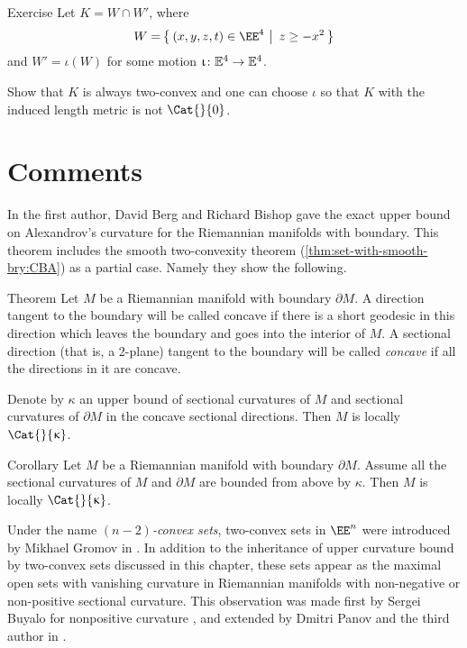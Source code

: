 \begin{thm}{Exercise}\label{ex:two-convex-not-a-CAT}
Let $K=W\cap W'$, where 
\[W=\set{(x,y,z,t)\in \EE^4}{z\ge -x^2}\]
and $W'=\iota(W)$ for some motion $\iota\:\EE^4\to\EE^4$.

Show that $K$ is always two-convex and one can choose $\iota$ so that $K$  with the induced length metric is not $\Cat{}{0}$.
\end{thm}









\section{Comments}

In \cite{a-b-b:CBA-m-w-b} the first author, David Berg and Richard Bishop gave the exact upper bound on Alexandrov's curvature for the Riemannian manifolds with boundary.
This theorem includes the smooth two-convexity theorem (\ref{thm:set-with-smooth-bry:CBA}) as a partial case.
Namely they show the following.

\begin{thm}{Theorem}
Let $M$ be a Riemannian manifold with boundary $\partial M$.
A direction tangent to the boundary will be called concave if there is a short geodesic in this direction which leaves the boundary and goes into the interior of $M$.
A sectional direction (that is, a 2-plane) 
tangent to the boundary 
will be called \emph{concave} if all the directions in it are concave.

Denote by $\kappa$ an upper bound of sectional curvatures of $M$ and  
sectional curvatures of $\partial M$ in the concave sectional directions. 
Then $M$ is locally $\Cat{}{\kappa}$. 
\end{thm}

\begin{thm}{Corollary}
Let $M$ be a Riemannian manifold with boundary $\partial M$. 
Assume all the sectional curvatures of $M$ and $\partial M$ are bounded from above by $\kappa$.
Then $M$ is locally $\Cat{}{\kappa}$.
\end{thm}

Under the name \emph{$(n-2)$-convex sets}, 
two-convex sets in $\EE^n$ were introduced by Mikhael Gromov in \cite{gromov:SaGMC}.
In addition to the inheritance of upper curvature bound by two-convex sets discussed in this chapter, 
these sets appear as the maximal open sets with vanishing curvature in  Riemannian manifolds with non-negative or non-positive sectional curvature.
This observation was made first by Sergei Buyalo for nonpositive curvature \cite[Lemma 5.8]{buyalo}, 
and extended by Dmitri Panov and the third author in \cite{panov-petrunin:sweeping}.

